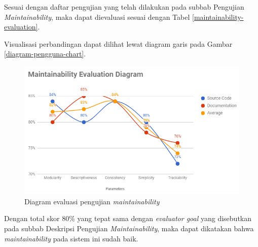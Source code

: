Sesuai dengan daftar pengujian yang telah dilakukan pada subbab Pengujian \textit{Maintainability}, maka dapat dievaluasi sesuai dengan Tabel \ref{maintainability-evaluation}.


Visualisasi perbandingan dapat dilihat lewat diagram garis pada Gambar \ref{diagram-pengguna-chart}.

\begin{figure}[H]
	\centering
	\includegraphics[width=\textwidth]{images/bab5/maintainability/maintainability-evaluation.png}
	\caption{Diagram evaluasi pengujian \textit{maintainability}}
	\label{maintainability-diagram}
\end{figure}

Dengan total skor 80\% yang tepat sama dengan \textit{evaluator goal} yang disebutkan pada subbab Deskripsi Pengujian \textit{Maintainability}, maka dapat dikatakan bahwa \textit{maintainability} pada sistem ini sudah baik.